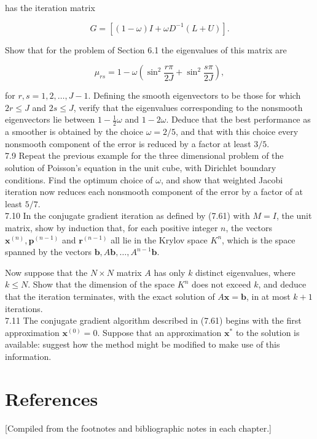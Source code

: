 \documentclass[10pt]{article}
\begin{document}
has the iteration matrix

\[
G=\left[(1-\omega) I+\omega D^{-1}(L+U)\right] .
\]

Show that for the problem of Section 6.1 the eigenvalues of this matrix are

\[
\mu_{r s}=1-\omega\left(\sin ^{2} \frac{r \pi}{2 J}+\sin ^{2} \frac{s \pi}{2 J}\right),
\]

for \(r, s=1,2, \ldots, J-1\). Defining the smooth eigenvectors to be those for which \(2 r \leq J\) and \(2 s \leq J\), verify that the eigenvalues corresponding to the nonsmooth eigenvectors lie between \(1-\frac{1}{2} \omega\) and \(1-2 \omega\). Deduce that the best performance as a smoother is obtained by the choice \(\omega=2 / 5\), and that with this choice every nonsmooth component of the error is reduced by a factor at least \(3 / 5\).\\
7.9 Repeat the previous example for the three dimensional problem of the solution of Poisson's equation in the unit cube, with Dirichlet boundary conditions. Find the optimum choice of \(\omega\), and show that weighted Jacobi iteration now reduces each nonsmooth component of the error by a factor of at least \(5 / 7\).\\
7.10 In the conjugate gradient iteration as defined by (7.61) with \(M=I\), the unit matrix, show by induction that, for each positive integer \(n\), the vectors \(\mathbf{x}^{(n)}, \mathbf{p}^{(n-1)}\) and \(\mathbf{r}^{(n-1)}\) all lie in the Krylov space \(K^{n}\), which is the space spanned by the vectors \(\mathbf{b}, A \mathbf{b}, \ldots, A^{n-1} \mathbf{b}\).

Now suppose that the \(N \times N\) matrix \(A\) has only \(k\) distinct eigenvalues, where \(k \leq N\). Show that the dimension of the space \(K^{n}\) does not exceed \(k\), and deduce that the iteration terminates, with the exact solution of \(A \mathbf{x}=\mathbf{b}\), in at most \(k+1\) iterations.\\
7.11 The conjugate gradient algorithm described in (7.61) begins with the first approximation \(\mathbf{x}^{(0)}=0\). Suppose that an approximation \(\mathbf{x}^{*}\) to the solution is available: suggest how the method might be modified to make use of this information.

\section*{References}
[Compiled from the footnotes and bibliographic notes in each chapter.]
\end{document}
